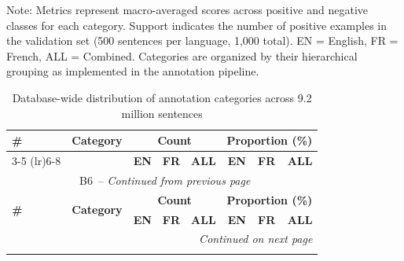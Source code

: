 \vspace{0.5em}
\noindent\footnotesize
Note: Metrics represent macro-averaged scores across positive and negative classes for each category. Support indicates the number of positive examples in the validation set (500 sentences per language, 1,000 total). EN = English, FR = French, ALL = Combined. Categories are organized by their hierarchical grouping as implemented in the annotation pipeline.
\endlandscape%
\landscape
{\footnotesize
{}
\setcounter{table}{5}
\renewcommand{\thetable}{B6}
\begin{longtable}{p{0.5cm}p{5.5cm}rrrrrr}
\caption{Database-wide distribution of annotation categories across 9.2 million sentences}
\label{tab:database_proportions}
 \\
\toprule
\multirow{2}{*}{\textbf{\#}} & \multirow{2}{*}{\textbf{Category}} & \multicolumn{3}{c}{\textbf{Count}} & \multicolumn{3}{c}{\textbf{Proportion (\%)}} \\
\cmidrule(lr){3-5} \cmidrule(lr){6-8}
& & \textbf{EN} & \textbf{FR} & \textbf{ALL} & \textbf{EN} & \textbf{FR} & \textbf{ALL} \\
\midrule
\endfirsthead
\multicolumn{8}{c}{\tablename\ \thetable\ -- \textit{Continued from previous page}} \\
\toprule
\multirow{2}{*}{\textbf{\#}} & \multirow{2}{*}{\textbf{Category}} & \multicolumn{3}{c}{\textbf{Count}} & \multicolumn{3}{c}{\textbf{Proportion (\%)}} \\
\cmidrule(lr){3-5} \cmidrule(lr){6-8}
& & \textbf{EN} & \textbf{FR} & \textbf{ALL} & \textbf{EN} & \textbf{FR} & \textbf{ALL} \\
\midrule
\endhead
\midrule
\multicolumn{8}{r}{\textit{Continued on next page}} \\
\endfoot
\bottomrule
\endlastfoot


\end{longtable}}
